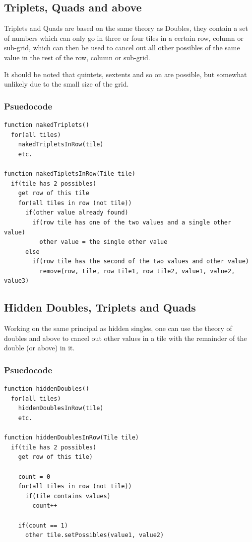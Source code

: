 \documentclass[10pt,letterpaper]{article}
\begin{document}
      \subsection{Triplets, Quads and above}
	Triplets and Quads are based on the same theory as Doubles, they contain a set of numbers which can only go in three or four tiles in a certain row, column or sub-grid, which can then be used to cancel out all other possibles of the same value in the rest of the row, column or sub-grid.
	
	It should be noted that quintets, sextents and so on are possible, but somewhat unlikely due to the small size of the grid.
      
	\subsubsection{Psuedocode}
	  \begin{verbatim}
function nakedTriplets()
  for(all tiles)
    nakedTripletsInRow(tile)
    etc.

function nakedTipletsInRow(Tile tile)
  if(tile has 2 possibles)
    get row of this tile
    for(all tiles in row (not tile))
      if(other value already found)
        if(row tile has one of the two values and a single other value)
          other value = the single other value
      else
        if(row tile has the second of the two values and other value)
          remove(row, tile, row tile1, row tile2, value1, value2, value3)
	  \end{verbatim}
      
      \subsection{Hidden Doubles, Triplets and Quads}
	Working on the same principal as hidden singles, one can use the theory of doubles and above to cancel out other values in a tile with the remainder of the double (or above) in it.
	
	\subsubsection{Psuedocode}
	  \begin{verbatim}
function hiddenDoubles()
  for(all tiles)
    hiddenDoublesInRow(tile)
    etc.

function hiddenDoublesInRow(Tile tile)
  if(tile has 2 possibles)
    get row of this tile)
    
    count = 0
    for(all tiles in row (not tile))
      if(tile contains values)
        count++
    
    if(count == 1)
      other tile.setPossibles(value1, value2)
	  \end{verbatim}
      
      
      \subsection{}
\end{document}
